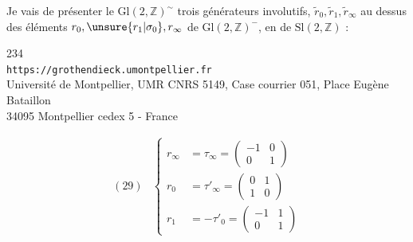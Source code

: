 Je vais  de présenter le  
$\mathrm{Gl}(2,\mathbb Z)^{\sim}$  trois générateurs involutifs,
 $\widetilde r_0,\widetilde r_1,\widetilde r_\infty$ au dessus des éléments
$r_0,\unsure{r_1|\sigma_0},r_\infty$ de $\mathrm{Gl}(2,\mathbb Z)^{-}$, en   de $\mathrm{Sl}(2,\mathbb Z)$ :


\begin{center}
234\\
\texttt{https://grothendieck.umontpellier.fr}\\
Université de Montpellier, UMR CNRS 5149, Case courrier 051, Place Eugène Bataillon\\
34095 Montpellier cedex 5 - France
\end{center}


\[
\begin{array}{ll}
(29)&\left\{
\begin{aligned}
r_\infty&=\tau_\infty=\begin{pmatrix}-1&0\\0&1\end{pmatrix}\\
r_0&=\tau'_\infty=\begin{pmatrix}0&1\\1&0\end{pmatrix}\\
r_1&=-\tau'_0=\begin{pmatrix}-1&1\\0&1\end{pmatrix}
\end{aligned}
\right.
\end{array}
\]
\margin{$\left[\begin{array}{ll}
(30)&\left\{
\begin{aligned}
r_0(\rho)&=\rho^{-1},\quad r_0(\sigma)=\sigma^{-1}\\
r_1&=\rho^{-1}r_0=r_0\rho\\
r_\infty&=\sigma r_0=r_0\sigma^{-1}
\end{aligned}\right.
\end{array}\right.$}

